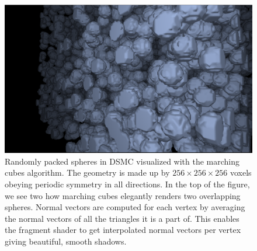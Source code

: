 \begin{figure}[htb]
\begin{center}
\includegraphics[width=\textwidth, trim=0cm 0cm 0cm 0cm, clip]{visualization/figures/marching_cubes_spheres_1.png}
\end{center}
\caption{Randomly packed spheres in DSMC visualized with the marching cubes algorithm. The geometry is made up by $256\times256\times256$ voxels obeying periodic symmetry in all directions. In the top of the figure, we see two how marching cubes elegantly renders two overlapping spheres. Normal vectors are computed for each vertex by averaging the normal vectors of all the triangles it is a part of. This enables the fragment shader to get interpolated normal vectors per vertex giving beautiful, smooth shadows.}
\label{fig:vis_marching_cubes_1}
\end{figure}